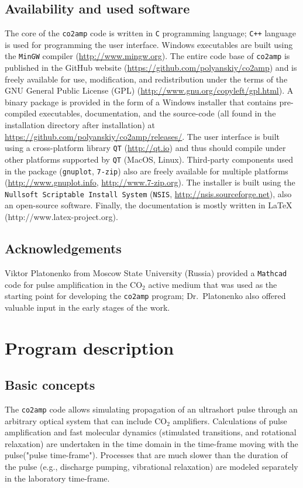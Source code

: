\documentclass{report}
\begin{document}
\section{Availability and used software}
The core of the \texttt{co2amp} code is written in \texttt{C} programming language; \texttt{C++} language is used for programming the user interface. Windows executables are built using the \texttt{MinGW} compiler (\url{http://www.mingw.org}). The entire code base of \texttt{co2amp} is published in the GitHub website (\url{https://github.com/polyanskiy/co2amp}) and is freely available for use, modification, and redistribution under the terms of the GNU General Public License (GPL) (\url{http://www.gnu.org/copyleft/gpl.html}). A binary package is provided in the form of a Windows installer that contains pre-compiled executables, documentation, and the source-code (all found in the installation directory after installation) at \url{https://github.com/polyanskiy/co2amp/releases/}. The user interface is built using a cross-platform library \texttt{QT} (\url{http://qt.io}) and thus should compile under other platforms supported by \texttt{QT} (MacOS, Linux). Third-party components used in the package (\texttt{gnuplot}, \texttt{7-zip}) also are freely available for multiple platforms (\url{http://www.gnuplot.info}, \url{http://www.7-zip.org}). The installer is built using the \texttt{Nullsoft Scriptable Install System} (\texttt{NSIS}, \url{http://nsis.sourceforge.net}), also an open-source software. Finally, the documentation is mostly written in {\LaTeX} (http://www.latex-project.org).

\section{Acknowledgements}
Viktor Platonenko from Moscow State University (Russia) provided a \texttt{Mathcad} code for pulse amplification in the {CO$_2$} active medium that was used as the  starting point for developing the \texttt{co2amp} program; Dr.~Platonenko also offered valuable input in the early stages of the work.



\chapter{Program description}

\section{Basic concepts}
The \texttt{co2amp} code allows simulating propagation of an ultrashort pulse through an arbitrary optical system that can include {CO$_2$} amplifiers. Calculations of pulse amplification and fast molecular dynamics (stimulated transitions, and rotational relaxation) are undertaken in the time domain in the time-frame moving with the pulse("pulse time-frame"). Processes that are much slower than the duration of the pulse (e.g., discharge pumping, vibrational relaxation) are modeled separately in the laboratory time-frame.
\end{document}
